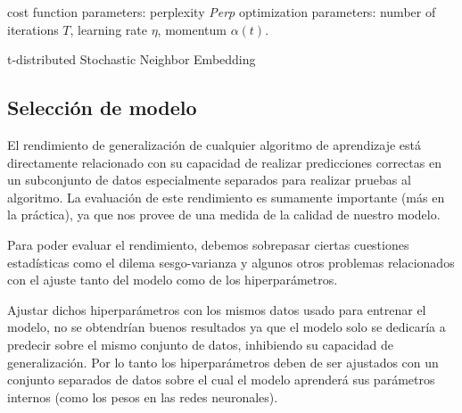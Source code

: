 \begin{algorithm}[H]
    \SetAlgoLined{}
    \BlankLine{}
    cost function parameters: perplexity \emph{Perp}
    \BlankLine{}
    optimization parameters: number of iterations \(T\), learning rate \(\eta\), momentum \(\alpha(t)\).
    \BlankLine{}
    \BlankLine{}
    
    \caption{t-distributed Stochastic Neighbor Embedding}\label{alg:tsne}
    \end{algorithm}

\subsection{Selección de modelo}

El rendimiento de generalización de cualquier algoritmo de aprendizaje está
directamente relacionado con su capacidad de realizar predicciones correctas en
un subconjunto de datos especialmente separados para realizar pruebas al
algoritmo. La evaluación de este rendimiento es sumamente importante (más en la
práctica), ya que nos provee de una medida de la calidad de nuestro modelo. 

Para poder evaluar el rendimiento, debemos sobrepasar ciertas cuestiones
estadísticas como el dilema sesgo-varianza y algunos otros problemas
relacionados con el ajuste tanto del modelo como de los hiperparámetros.

Ajustar dichos hiperparámetros con los mismos datos usado para entrenar el
modelo, no se obtendrían buenos resultados ya que el modelo solo se dedicaría a
predecir sobre el mismo conjunto de datos, inhibiendo su capacidad de
generalización. Por lo tanto los hiperparámetros deben de ser ajustados con un
conjunto separados de datos sobre el cual el modelo aprenderá sus parámetros
internos (como los pesos en las redes neuronales). 

